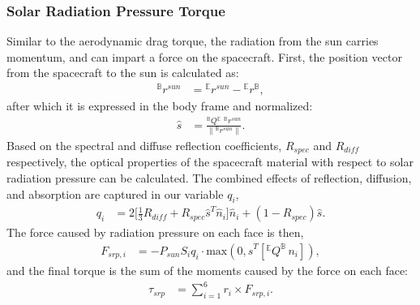 \subsubsection{Solar Radiation Pressure Torque}
Similar to the aerodynamic drag torque, the radiation from the sun carries momentum, and can impart a force on the spacecraft. First, the position vector from the spacecraft to the sun is calculated as:
\begin{align}
    {}^{\mathbb{B}}r{}^{sun} &= {}^{\mathbb{E}}r{}^{sun} - {}^{\mathbb{E}}r{}^{\mathbb{B}},
\end{align}
after which it is expressed in the body frame and normalized:
\begin{align}
     \hat{s} &= \frac{ {}^{\mathbb{B}} Q {}^{\mathbb{E}} \,\,{}^{\mathbb{B}}r{}^{sun}}{\| {}^{\mathbb{B}}r{}^{sun}\|}.
\end{align}
Based on the spectral and diffuse reflection coefficients, $R_{spec}$ and $R_{diff}$ respectively, the optical properties of the spacecraft material with respect to solar radiation pressure can be calculated. The combined effects of reflection, diffusion, and absorption are captured in our variable $q_i$, 
\begin{align}
    q_i &=  2\big[ \frac{1}{3}R_{diff} + R_{spec} \hat{s}^T \hat{n}_i\big] \hat{n}_i + (1 - R_{spec})\hat{s}. 
\end{align}
The force caused by radiation pressure on each face is then, 
\begin{align}
    F_{srp,i} &= -P_{sun} S_i q_i \cdot \text{max}(0,\hat{s}^T [^{\mathbb{E}}Q^{\mathbb{B}} \, n_i]),
\end{align}
and the final torque is the sum of the moments caused by the force on each face:
\begin{align}
    \tau_{srp} &=  \sum_{i = 1}^6 r_i \times  F_{srp,i}.
\end{align}
